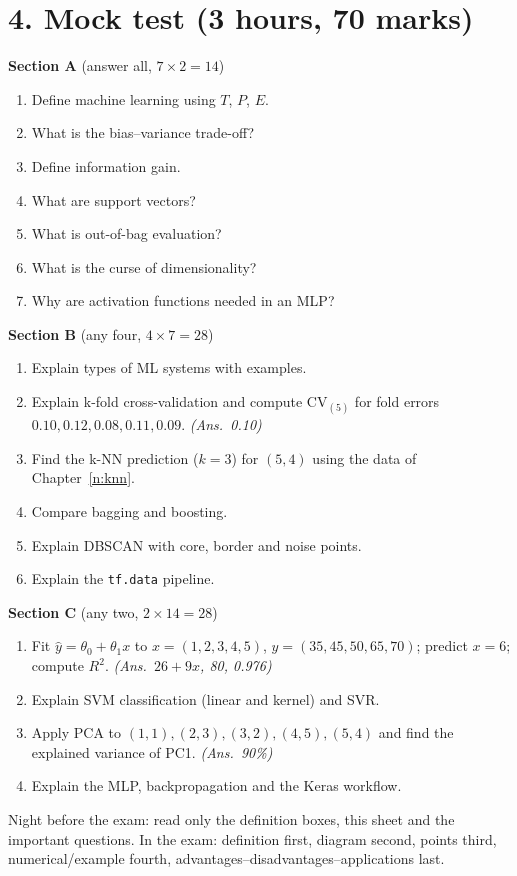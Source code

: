 \section*{4. Mock test (3 hours, 70 marks)}
\textbf{Section A} (answer all, $7\times2=14$)
\begin{enumerate}[label=\arabic*.]
  \item Define machine learning using $T$, $P$, $E$.
  \item What is the bias--variance trade-off?
  \item Define information gain.
  \item What are support vectors?
  \item What is out-of-bag evaluation?
  \item What is the curse of dimensionality?
  \item Why are activation functions needed in an MLP?
\end{enumerate}
\textbf{Section B} (any four, $4\times7=28$)
\begin{enumerate}[label=\arabic*.,resume]
  \item Explain types of ML systems with examples.
  \item Explain k-fold cross-validation and compute $\mathrm{CV}_{(5)}$ for fold errors $0.10,0.12,0.08,0.11,0.09$. \emph{(Ans.\ 0.10)}
  \item Find the k-NN prediction ($k=3$) for $(5,4)$ using the data of Chapter~\ref{n:knn}.
  \item Compare bagging and boosting.
  \item Explain DBSCAN with core, border and noise points.
  \item Explain the \texttt{tf.data} pipeline.
\end{enumerate}
\textbf{Section C} (any two, $2\times14=28$)
\begin{enumerate}[label=\arabic*.,resume]
  \item Fit $\hat y=\theta_0+\theta_1x$ to $x=(1,2,3,4,5)$, $y=(35,45,50,65,70)$; predict $x=6$; compute $R^2$. \emph{(Ans.\ $26+9x$, 80, 0.976)}
  \item Explain SVM classification (linear and kernel) and SVR.
  \item Apply PCA to $(1,1),(2,3),(3,2),(4,5),(5,4)$ and find the explained variance of PC1. \emph{(Ans.\ 90\%)}
  \item Explain the MLP, backpropagation and the Keras workflow.
\end{enumerate}

\begin{imp}
Night before the exam: read only the definition boxes, this sheet and the important questions. In the exam: definition first, diagram second, points third, numerical/example fourth, advantages--disadvantages--applications last.
\end{imp}

